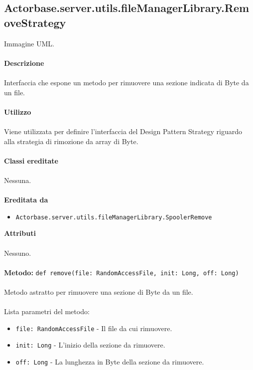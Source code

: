\documentclass[a4paper]{article}
\begin{document}
	\subsection{Actorbase.server.utils.fileManagerLibrary.RemoveStrategy}
		Immagine UML.
		\\ \\
		\textbf{Descrizione}
		\\ \\
		Interfaccia che espone un metodo per rimuovere una sezione indicata di Byte da un file.
		\\ \\
		\textbf{Utilizzo}
		\\ \\
		Viene utilizzata per definire l'interfaccia del Design Pattern Strategy riguardo alla strategia di rimozione da array di Byte.
		\\ \\
		\textbf{Classi ereditate}
		\\ \\
		Nessuna.
		\\ \\
		\textbf{Ereditata da}
		\begin{itemize}
			\item \texttt{Actorbase.server.utils.fileManagerLibrary.SpoolerRemove}
		\end{itemize}
		\textbf{Attributi}
		\\ \\
		Nessuno.
		\\ \\
		\textbf{Metodo:} \texttt{def remove(file: RandomAccessFile, init: Long, off: Long)}
		\\ \\
		Metodo astratto per rimuovere una sezione di Byte da un file.
		\\ \\
		Lista parametri del metodo:
		\begin{itemize}
			\item \texttt{file: RandomAccessFile} - Il file da cui rimuovere.
			\item \texttt{init: Long} - L'inizio della sezione da rimuovere.
			\item \texttt{off: Long} - La lunghezza in Byte della sezione da rimuovere.
		\end{itemize}
		
			
\end{document}

